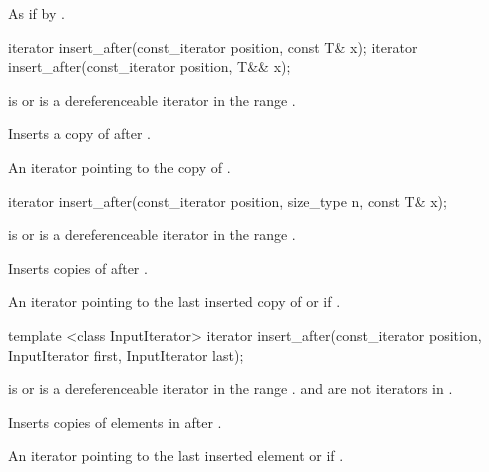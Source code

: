 \begin{itemdescr}
\pnum
\effects As if by .
\end{itemdescr}

%
%
\begin{itemdecl}
iterator insert_after(const_iterator position, const T& x);
iterator insert_after(const_iterator position, T&& x);
\end{itemdecl}

\begin{itemdescr}
\pnum
\requires {} is  or is a dereferenceable
iterator in the range .

\pnum
\effects Inserts a copy of  after .

\pnum
\returns An iterator pointing to the copy of .
\end{itemdescr}

%
%
\begin{itemdecl}
iterator insert_after(const_iterator position, size_type n, const T& x);
\end{itemdecl}

\begin{itemdescr}
\pnum
\requires {} is  or is a dereferenceable
iterator in the range .

\pnum
\effects Inserts  copies of  after .

\pnum
\returns
An iterator pointing to the last inserted copy of  or  if .
\end{itemdescr}

%
%
\begin{itemdecl}
template <class InputIterator>
  iterator insert_after(const_iterator position, InputIterator first, InputIterator last);
\end{itemdecl}

\begin{itemdescr}
\pnum
\requires {} is  or is a dereferenceable
iterator in the range .
 and  are not iterators in .

\pnum
\effects Inserts copies of elements in  after .

\pnum
\returns
An iterator pointing to the last inserted element or  if .
\end{itemdescr}

